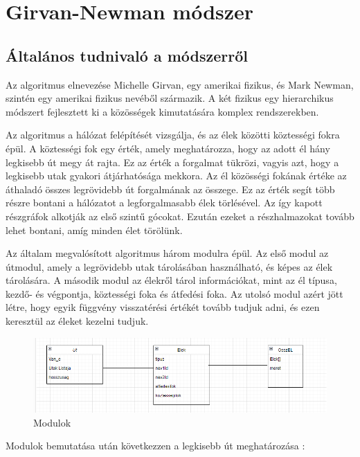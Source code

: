 \chapter{Girvan-Newman módszer}
\section{Általános tudnivaló a módszerről}

Az algoritmus elnevezése Michelle Girvan, egy amerikai fizikus, és Mark Newman, szintén egy amerikai fizikus nevéből származik. A két fizikus egy hierarchikus módszert fejlesztett ki a közösségek kimutatására komplex rendszerekben.

Az algoritmus a hálózat felépítését vizsgálja, és az élek közötti köztességi fokra épül. A köztességi fok egy érték, amely meghatározza, hogy az adott él hány legkisebb út megy át rajta. Ez az érték a forgalmat tükrözi, vagyis azt, hogy a legkisebb utak gyakori átjárhatósága mekkora. Az él közösségi fokának értéke az áthaladó összes legrövidebb út forgalmának az összege. Ez az érték segít több részre bontani a hálózatot a legforgalmasabb élek törlésével. Az így kapott részgráfok alkotják az első szintű gócokat. Ezután ezeket a részhalmazokat tovább lehet bontani, amíg minden élet törölünk.

Az általam megvalósított algoritmus három modulra épül. Az első modul az útmodul, amely a legrövidebb utak tárolásában használható, és képes az élek tárolására. A második modul az élekről tárol információkat, mint az él típusa, kezdő- és végpontja, köztességi foka és átfedési foka. Az utolsó modul azért jött létre, hogy egyik függvény visszatérési értékét tovább tudjuk adni, és ezen keresztül az éleket kezelni tudjuk.

\begin{figure}[h]
    \centering
    \includegraphics[scale=0.9]{images/modulok}
    \caption{Modulok}
    \label{fig:enter-label}
\end{figure}
\newpage
Modulok bemutatása után következzen a legkisebb út meghatározása :


